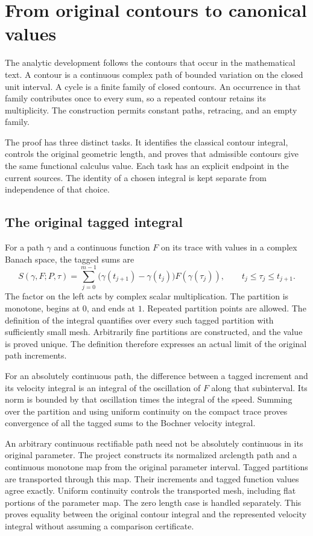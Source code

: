\section{From original contours to canonical values}\label{sec:analytic-closeout}

The analytic development follows the contours that occur in the mathematical text. A contour is a continuous complex path of bounded variation on the closed unit interval. A cycle is a finite family of closed contours. An occurrence in that family contributes once to every sum, so a repeated contour retains its multiplicity. The construction permits constant paths, retracing, and an empty family.

The proof has three distinct tasks. It identifies the classical contour integral, controls the original geometric length, and proves that admissible contours give the same functional calculus value. Each task has an explicit endpoint in the current sources. The identity of a chosen integral is kept separate from independence of that choice.

\subsection{The original tagged integral}

For a path $\gamma$ and a continuous function $F$ on its trace with values in a complex Banach space, the tagged sums are
\[
 S(\gamma,F;P,\tau)
 =\sum_{j=0}^{m-1}
   \bigl(\gamma(t_{j+1})-\gamma(t_j)\bigr)F(\gamma(\tau_j)),
 \qquad t_j\leq\tau_j\leq t_{j+1}.
\]
The factor on the left acts by complex scalar multiplication. The partition is monotone, begins at $0$, and ends at $1$. Repeated partition points are allowed. The definition of the integral quantifies over every such tagged partition with sufficiently small mesh. Arbitrarily fine partitions are constructed, and the value is proved unique. The definition therefore expresses an actual limit of the original path increments.

For an absolutely continuous path, the difference between a tagged increment and its velocity integral is an integral of the oscillation of $F$ along that subinterval. Its norm is bounded by that oscillation times the integral of the speed. Summing over the partition and using uniform continuity on the compact trace proves convergence of all the tagged sums to the Bochner velocity integral.

An arbitrary continuous rectifiable path need not be absolutely continuous in its original parameter. The project constructs its normalized arclength path and a continuous monotone map from the original parameter interval. Tagged partitions are transported through this map. Their increments and tagged function values agree exactly. Uniform continuity controls the transported mesh, including flat portions of the parameter map. The zero length case is handled separately. This proves equality between the original contour integral and the represented velocity integral without assuming a comparison certificate.

